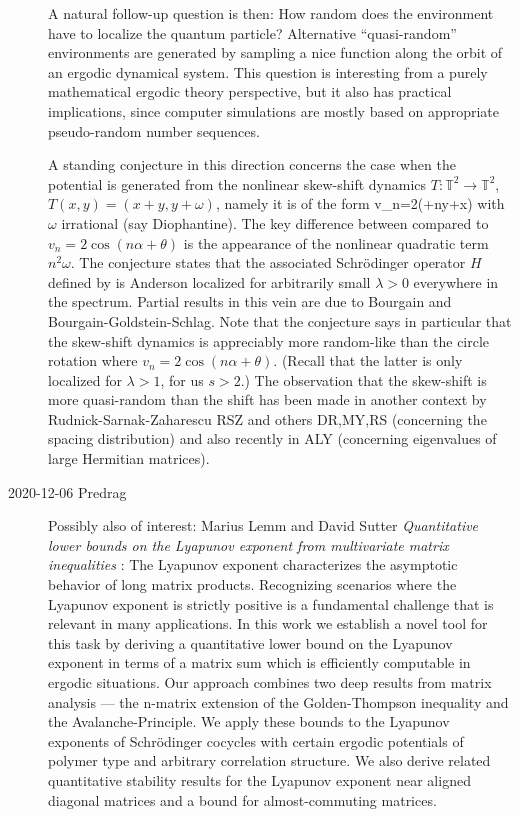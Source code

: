 \begin{description}
A natural follow-up question is then: How random does the environment
have to localize the quantum particle? Alternative ``quasi-random''
environments are generated by sampling a nice function along the orbit of
an ergodic dynamical system. This question is interesting from a purely
mathematical ergodic theory perspective, but it also has practical
implications, since computer simulations are mostly based on appropriate
pseudo-random number sequences.

A standing conjecture in this direction concerns the case when the
potential is generated from the nonlinear skew-shift dynamics $T:\mathbb
T^2\to\mathbb T^2$, $T(x,y)=(x+y,y+\omega)$, namely it is of the form
\beq
\label{LeAdYa19:vndefn}
v_n=2\cos\left(\omega +ny+x\right)
\eeq
with $\omega$ irrational (say Diophantine). The key difference between
 compared to $v_n=2\cos(n\alpha+\theta)$ is the
appearance of the nonlinear quadratic term $n^2\omega$. The conjecture
states that the associated Schr{\"o}dinger operator $H$ defined by
 is Anderson localized for arbitrarily small
$\lambda>0$ everywhere in the spectrum. Partial results in this vein are
due to
Bourgain %
and
Bourgain-Goldstein-Schlag.  %
Note that the conjecture says in particular that the skew-shift dynamics
is appreciably more random-like than the circle rotation where
$v_n=2\cos(n\alpha+\theta)$. (Recall that the latter is only localized
for $\lambda>1$, for us  ${s}>2$.) The observation that the skew-shift is
more quasi-random than the shift has been made in another context by
Rudnick-Sarnak-Zaharescu {RSZ} and others {DR,MY,RS} (concerning the
spacing distribution) and also recently in {ALY} (concerning eigenvalues
of large Hermitian matrices).


\item[2020-12-06 Predrag]
Possibly also of interest:
Marius Lemm and David Sutter
{\em Quantitative lower bounds on the Lyapunov exponent from multivariate
matrix inequalities} :
The Lyapunov exponent characterizes the asymptotic behavior of long
matrix products. Recognizing scenarios where the Lyapunov exponent is
strictly positive is a fundamental challenge that is relevant in many
applications. In this work we establish a novel tool for this task by
deriving a quantitative lower bound on the Lyapunov exponent in terms of
a matrix sum which is efficiently computable in ergodic situations. Our
approach combines two deep results from matrix analysis --- the n-matrix
extension of the Golden-Thompson inequality and the Avalanche-Principle.
We apply these bounds to the Lyapunov exponents of Schrödinger cocycles
with certain ergodic potentials of polymer type and arbitrary correlation
structure. We also derive related quantitative stability results for the
Lyapunov exponent near aligned diagonal matrices and a bound for
almost-commuting matrices.


\end{description}
